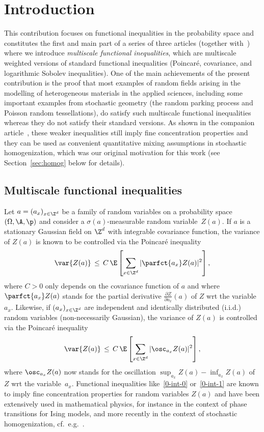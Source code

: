 \section{Introduction}

This contribution focuses on functional inequalities in the probability space and constitutes the first and main part of a series of three articles (together with~\cite{DG1,DG3}) where we introduce \emph{multiscale functional inequalities}, which are multiscale weighted versions of standard functional inequalities (Poincaré, covariance, and logarithmic Sobolev inequalities). One of the main achievements of the present contribution is the proof that most examples of random fields arising in the modelling of heterogeneous materials in the applied sciences, including some important examples from stochastic geometry (the random parking process and Poisson random tessellations), do satisfy such multiscale functional inequalities whereas they do not satisfy their standard versions. As shown in the companion article~\cite{DG1}, these weaker inequalities still imply fine concentration properties and they can be used as convenient quantitative mixing assumptions in stochastic homogenization, which was our original motivation for this work (see Section~\ref{sec:homog} below for details).



\subsection{Multiscale functional inequalities}

Let $a=(a_x)_{x\in \Z^d}$ be a family of random variables on a probability space $(\Omega,\A,\p)$ and consider a $\sigma(a)$-measurable random variable~$Z(a)$. If $a$ is a stationary Gaussian field on $\Z^d$ with integrable covariance function, the variance of $Z(a)$ is known to be controlled via the Poincaré inequality
\begin{equation}\label{0-int-0}
\var{Z(a)} \,\le \,C\,\E\left[{\sum_{x\in \Z^d} |\parfct{a_x} Z(a)|^2}\right],
\end{equation}
where $C>0$ only depends on the covariance function of $a$ and where $\parfct{a_x} Z(a)$ stands for the partial derivative $\frac{\partial Z}{\partial a_x}(a)$ of $Z$ wrt the variable $a_x$. Likewise, if $(a_x)_{x\in \Z^d}$ are independent and identically distributed (i.i.d.) random variables (non-necessarily Gaussian), the variance of $Z(a)$ is controlled via the Poincaré inequality
\begin{equation}\label{0-int-1}
\var{Z(a)} \,\le \,C\,\E\left[{ \sum_{x\in \Z^d} |\osc_{a_x} Z(a)|^2}\right],
\end{equation}
where $\osc_{a_x} Z(a)$ now stands for the oscillation $\sup_{a_x} Z(a)-\inf_{a_x} Z(a)$ of $Z$ wrt the variable~$a_x$. Functional inequalities like~\eqref{0-int-0} or~\eqref{0-int-1} are known to imply fine concentration properties for random variables $Z(a)$ and have been extensively used in mathematical physics, for instance in the context of phase transitions for Ising models, and more recently in the context of stochastic homogenization, cf.~e.g.~\cite{DGO1,Glotto-Neukamm-14,GNO-I,Glotto-11,Glotto-12,Marahrens-Otto-15,Naddaf-Spencer-98}.

